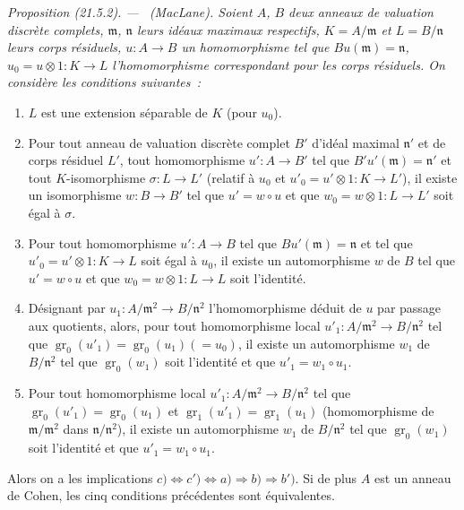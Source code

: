 \documentclass[10pt,oneside]{book}
\makeatletter
\newcommand{\setmanualcurrentlabel}[1]{\def\@currentlabel{#1}}
\newcommand{\oldpage}[2][]{%
  \setcounter{footnote}{0}%
  \marginpar{\scriptsize\textbf{#1}~|~#2}\ignorespaces}
\newenvironment{proposition}[1][]{%
  \setmanualcurrentlabel{#1}\par\medskip\noindent\itshape Proposition (#1). ---\ }{\par}
\makeatother
\begin{document}
\begin{proposition}[21.5.2]
\label{0.21.5.2-fr}
\textnormal{(MacLane).}
Soient $A$, $B$ deux anneaux de valuation discrète complets, $\mathfrak m$,
$\mathfrak n$ leurs idéaux maximaux respectifs, $K=A/\mathfrak m$ et
$L=B/\mathfrak n$ leurs corps résiduels, $u:A\to B$ un homomorphisme tel que
$Bu(\mathfrak m)=\mathfrak n$, $u_0=u\otimes 1:K\to L$ l'homomorphisme
correspondant pour les corps résiduels. On considère les conditions suivantes~:
\begin{enumerate}
  \item[\rm a)] $L$ est une extension séparable de $K$ (pour $u_0$).
  \item[\rm b)] Pour tout anneau de valuation discrète complet $B'$ d'idéal
  maximal $\mathfrak n'$ et de corps résiduel $L'$,
\oldpage[0\textsubscript{IV-1}]{165}
  tout homomorphisme
  $u':A\to B'$ tel que $B'u'(\mathfrak m)=\mathfrak n'$ et tout
  $K$-isomorphisme $\sigma:L\to L'$ (relatif à $u_0$ et
  $u'_0=u'\otimes1:K\to L'$), il existe un isomorphisme $w:B\to B'$ tel que
  $u'=w\circ u$ et que $w_0=w\otimes1:L\to L'$ soit égal à $\sigma$.
  \item[\rm b$'$)] Pour tout homomorphisme $u':A\to B$ tel que
  $Bu'(\mathfrak m)=\mathfrak n$ et tel que $u'_0=u'\otimes1:K\to L$ soit égal
  à $u_0$, il existe un automorphisme $w$ de $B$ tel que $u'=w\circ u$ et que
  $w_0=w\otimes1:L\to L$ soit l'identité.
  \item[\rm c)] Désignant par $u_1:A/\mathfrak m^2\to B/\mathfrak n^2$
  l'homomorphisme déduit de $u$ par passage aux quotients, alors, pour tout
  homomorphisme local $u'_1:A/\mathfrak m^2\to B/\mathfrak n^2$ tel que
  $\operatorname{gr}_0(u'_1)=\operatorname{gr}_0(u_1)(=u_0)$, il existe un
  automorphisme $w_1$ de $B/\mathfrak n^2$ tel que
  $\operatorname{gr}_0(w_1)$ soit l'identité et que $u'_1=w_1\circ u_1$.
  \item[\rm c$'$)] Pour tout homomorphisme local $u'_1:A/\mathfrak m^2\to
  B/\mathfrak n^2$ tel que $\operatorname{gr}_0(u'_1)=\operatorname{gr}_0(u_1)$
  et $\operatorname{gr}_1(u'_1)=\operatorname{gr}_1(u_1)$
  (homomorphisme de $\mathfrak m/\mathfrak m^2$ dans
  $\mathfrak n/\mathfrak n^2$), il existe un automorphisme $w_1$ de
  $B/\mathfrak n^2$ tel que $\operatorname{gr}_0(w_1)$ soit l'identité et que
  $u'_1=w_1\circ u_1$.
\end{enumerate}
 Alors on a les implications $c)\Leftrightarrow c')\Leftrightarrow a)\Rightarrow b)
 \Rightarrow b')$. Si de plus $A$ est un anneau de Cohen, les cinq conditions
précédentes sont équivalentes.

\end{proposition}
\end{document}
